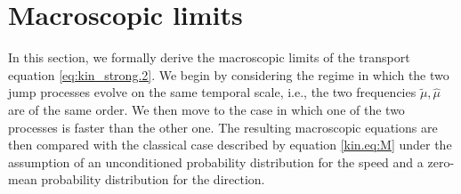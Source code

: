 \documentclass[a4paper]{article}
\theoremstyle{Theorem}\newtheorem{proposition}{Proposition}[section]
\theoremstyle{Remark}\newtheorem{remark}{Remark}[section]
\theoremstyle{Theorem}\newtheorem{theorem}{Theorem}[section]
\newcommand{\hmu}{\hat{\mu}}
\newcommand{\tmu}{\tilde{\mu}}
\begin{document}
\section{Macroscopic limits}\label{sec:macro_lim}
In this section, we formally derive the macroscopic limits of the transport equation \eqref{eq:kin_strong.2}. %
We begin by considering the regime in which the two jump processes evolve on the same temporal scale, i.e., the two frequencies $\tmu,\hmu$ are of the same order. We then move to the case in which one of the two processes is faster than the other one. The resulting macroscopic equations are then compared with the classical case described by equation \eqref{kin.eq:M} under the assumption of an unconditioned probability distribution for the speed and a zero-mean probability distribution for the direction.
\end{document}
